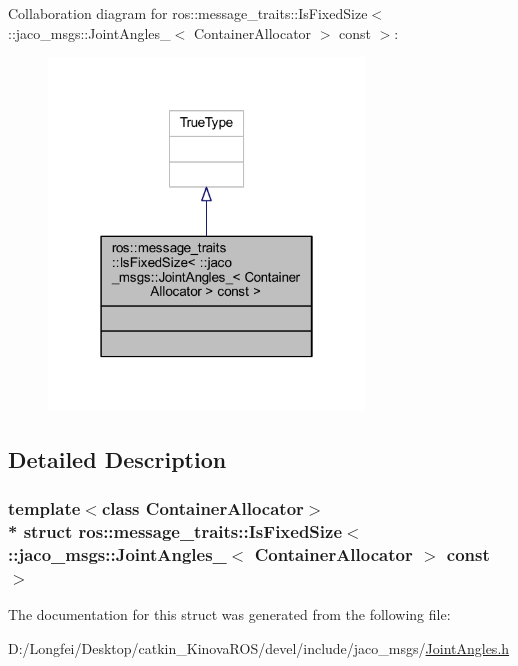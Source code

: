 Collaboration diagram for ros\+:\+:message\+\_\+traits\+:\+:Is\+Fixed\+Size$<$ \+:\+:jaco\+\_\+msgs\+:\+:Joint\+Angles\+\_\+$<$ Container\+Allocator $>$ const $>$\+:
\nopagebreak
\begin{figure}[H]
\begin{center}
\leavevmode
\includegraphics[width=238pt]{d5/d3d/structros_1_1message__traits_1_1IsFixedSize_3_01_1_1jaco__msgs_1_1JointAngles___3_01ContainerAll44d4b80f413a6a2c10f91cbf9957e639}
\end{center}
\end{figure}


\subsection{Detailed Description}
\subsubsection*{template$<$class Container\+Allocator$>$\\*
struct ros\+::message\+\_\+traits\+::\+Is\+Fixed\+Size$<$ \+::jaco\+\_\+msgs\+::\+Joint\+Angles\+\_\+$<$ Container\+Allocator $>$ const  $>$}



The documentation for this struct was generated from the following file\+:\begin{DoxyCompactItemize}
\item 
D\+:/\+Longfei/\+Desktop/catkin\+\_\+\+Kinova\+R\+O\+S/devel/include/jaco\+\_\+msgs/\hyperlink{JointAngles_8h}{Joint\+Angles.\+h}\end{DoxyCompactItemize}
